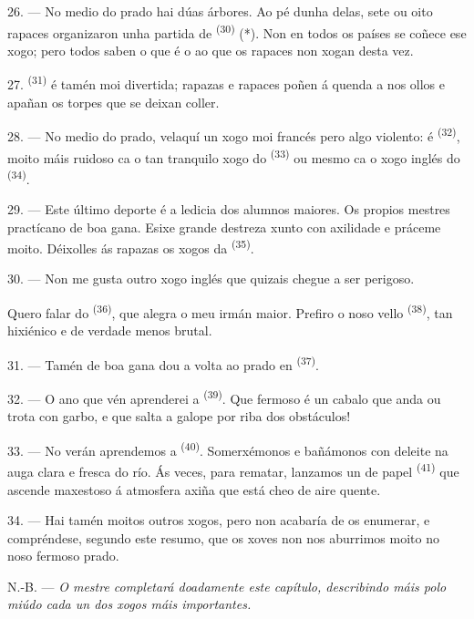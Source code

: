 26. --- No medio do prado hai dúas árbores. Ao pé dunha delas, sete ou oito rapaces
organizaron unha partida de  \textsuperscript{(30)} (*).
Non en todos os países se coñece ese xogo; pero todos saben o que é o  ao que os rapaces non xogan desta vez.

\VUsaut{5.0mm}
\VUsaut{3.4mm}

27.  \textsuperscript{(31)} é tamén moi divertida; rapazas e
rapaces poñen á quenda a  nos ollos e apañan os torpes que se deixan
coller.

28. --- No medio do prado, velaquí un xogo moi francés pero algo violento: é
 \textsuperscript{(32)}, moito máis ruidoso ca o tan tranquilo xogo do
 \textsuperscript{(33)} ou mesmo ca o xogo inglés do
 \textsuperscript{(34)}.

29. --- Este último deporte é a ledicia dos alumnos maiores. Os propios mestres practícano de boa
gana. Esixe grande destreza xunto con axilidade e práceme moito.
Déixolles ás rapazas os xogos da  \textsuperscript{(35)}.

30. --- Non me gusta outro xogo inglés que quizais chegue a ser perigoso.

Quero falar do  \textsuperscript{(36)}, que alegra o meu irmán maior.
Prefiro o noso vello  \textsuperscript{(38)}, tan hixiénico e
de verdade menos brutal.

\VUsaut{4.6mm}
\VUsaut{3.0mm}

31. --- Tamén de boa gana dou a volta ao prado en 
\textsuperscript{(37)}.

32. --- O ano que vén aprenderei a  \textsuperscript{(39)}.
Que fermoso é un cabalo que anda ou trota con garbo, e que salta a galope por riba
dos obstáculos!

33. --- No verán aprendemos a  \textsuperscript{(40)}. Somerxémonos e
bañámonos con deleite na auga clara e fresca do río. Ás veces, para rematar,
lanzamos un  de papel \textsuperscript{(41)} que ascende maxestoso á
atmosfera axiña que está cheo de aire quente.

34. --- Hai tamén moitos outros xogos, pero non acabaría de os enumerar, e
compréndese, segundo este resumo, que os xoves non nos aburrimos moito no noso fermoso
prado.

N.-B. --- \textit{O mestre completará doadamente este capítulo, describindo máis polo
miúdo cada un dos xogos máis importantes.}
